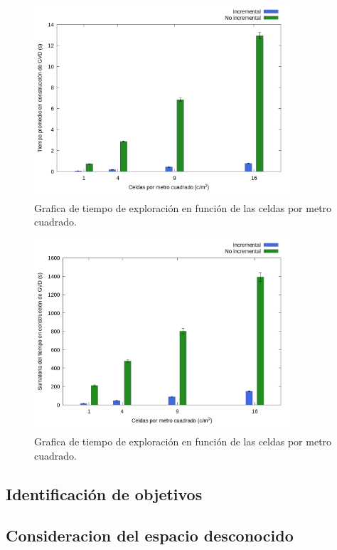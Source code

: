 \begin{figure}[H]
  \centerfloat

  \includegraphics[clip=true, width=0.85\textwidth]{imagenes/graficas_chicas/graficas_histo_num/incrementalidad/gvd_construction_time_mean.png}

  \caption{Grafica de tiempo de exploración en función de las celdas por metro cuadrado.}\label{fig:gra:inc2}

\end{figure}

\begin{figure}[H]
  \centerfloat

  \includegraphics[clip=true, width=0.85\textwidth]{imagenes/graficas_chicas/graficas_histo_num/incrementalidad/gvd_construction_time_sum.png}

  \caption{Grafica de tiempo de exploración en función de las celdas por metro cuadrado.}\label{fig:gra:incs3}

\end{figure}

\subsection{Identificación de objetivos}\label{sec:exp:idobj}

\subsection{Consideracion del espacio desconocido}\label{sec:exp:desco}


